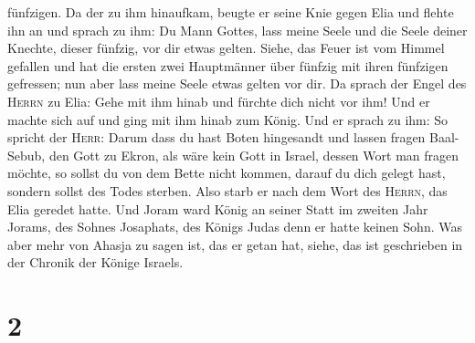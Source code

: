 fünfzigen. Da der zu ihm hinaufkam, beugte er seine Knie gegen Elia und
flehte ihn an und sprach zu ihm: Du Mann Gottes, lass meine Seele und
die Seele deiner Knechte, dieser fünfzig, vor dir etwas gelten.
 Siehe, das Feuer ist vom Himmel gefallen und hat die
ersten zwei Hauptmänner über fünfzig mit ihren fünfzigen gefressen; nun
aber lass meine Seele etwas gelten vor dir.  Da sprach
der Engel des \textsc{Herrn} zu Elia: Gehe mit ihm hinab und fürchte
dich nicht vor ihm! Und er machte sich auf und ging mit ihm hinab zum
König.  Und er sprach zu ihm: So spricht der
\textsc{Herr}: Darum dass du hast Boten hingesandt und lassen fragen
Baal-Sebub, den Gott zu Ekron, als wäre kein Gott in Israel, dessen Wort
man fragen möchte, so sollst du von dem Bette nicht kommen, darauf du
dich gelegt hast, sondern sollst des Todes sterben.  Also
starb er nach dem Wort des \textsc{Herrn}, das Elia geredet hatte. Und
Joram ward König an seiner Statt im zweiten Jahr Jorams, des Sohnes
Josaphats, des Königs Judas denn er hatte keinen Sohn. 
Was aber mehr von Ahasja zu sagen ist, das er getan hat, siehe, das ist
geschrieben in der Chronik der Könige Israels.

\hypertarget{section-1}{%
\section{2}\label{section-1}}

